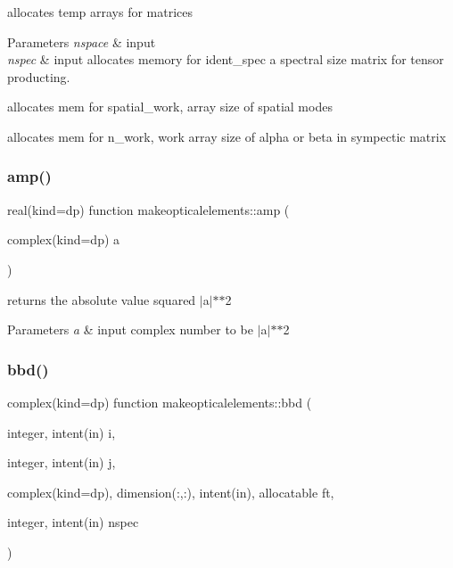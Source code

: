 allocates temp arrays for matrices 


\begin{DoxyParams}{Parameters}
{\em nspace} & input \\
\hline
{\em nspec} & input  allocates memory for ident\+\_\+spec a spectral size matrix for tensor producting.\\
\hline
\end{DoxyParams}
allocates mem for spatial\+\_\+work, array size of spatial modes

allocates mem for n\+\_\+work, work array size of alpha or beta in sympectic matrix \mbox{\label{namespacemakeopticalelements_a0649740479f47221d009b8d496b78c8b}} 
\subsubsection{\texorpdfstring{amp()}{amp()}}
{\footnotesize\ttfamily real(kind=dp) function makeopticalelements\+::amp (\begin{DoxyParamCaption}\item[{complex(kind=dp)}]{a }\end{DoxyParamCaption})}



returns the absolute value squared $\vert$a$\vert$$\ast$$\ast$2 


\begin{DoxyParams}{Parameters}
{\em a} & input complex number to be $\vert$a$\vert$$\ast$$\ast$2 \\
\hline
\end{DoxyParams}
\mbox{\label{namespacemakeopticalelements_a7d0e54a1c7f830fd961f3c99d0a49b30}} 
\subsubsection{\texorpdfstring{bbd()}{bbd()}}
{\footnotesize\ttfamily complex(kind=dp) function makeopticalelements\+::bbd (\begin{DoxyParamCaption}\item[{integer, intent(in)}]{i,  }\item[{integer, intent(in)}]{j,  }\item[{complex(kind=dp), dimension(\+:,\+:), intent(in), allocatable}]{ft,  }\item[{integer, intent(in)}]{nspec }\end{DoxyParamCaption})}



